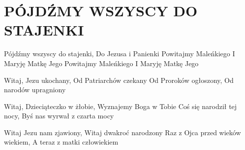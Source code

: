 \documentclass[../../../songbook.tex]{subfiles}
\begin{document}
\TabPositions{8cm} %
\section*{PÓJDŹMY WSZYSCY DO STAJENKI}
{}
\vspace{0.5cm}
Pójdźmy wszyscy do stajenki,	 \newline
Do Jezusa i Panienki			 \newline
Powitajmy Maleńkiego 		  \newline
I Maryję Matkę Jego			 \newline
\-\hspace{1cm} Powitajmy Maleńkiego	   \newline	
\-\hspace{1cm} I Maryję Matkę Jego		 \newline

Witaj, Jezu ukochany,  \newline
Od Patriarchów czekany \newline
Od Proroków ogłoszony,  \newline
Od narodów upragniony \newline
	
Witaj, Dzieciąteczko w żłobie, \newline
Wyznajemy Boga w Tobie \newline
Coś się narodził tej nocy,  \newline
Byś nas wyrwał z czarta mocy \newline

Witaj Jezu nam zjawiony,  \newline
Witaj dwakroć narodzony \newline
Raz z Ojca przed wieków wiekiem,  \newline
A teraz z matki człowiekiem \newline
\end{document}
